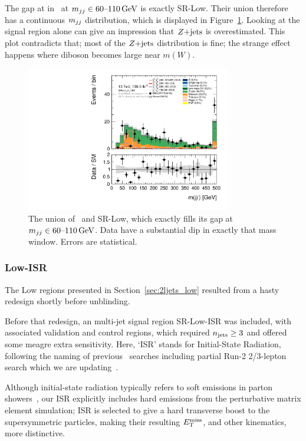 The gap at in \crz\ at $\mjj \in 60\textrm{--}110\,\eV[G]$ is exactly SR-Low.
Their union therefore has a continuous $\mjj$ distribution, which is displayed
in Figure~\ref{fig:2ljets_low_sr_or_cr_region}.
Looking at the signal region alone can give an impression that $\zjets$ is
overestimated.
This plot contradicts that; most of the $\zjets$ distribution is fine;
the strange effect happens where diboson becomes large near $m(W)$.

\begin{figure}[tp]
\centering
\includegraphics[width=0.8\textwidth]{figures/2ljets_low_mjj_SRLow_or_CRZ.pdf}
\caption[
The union of CR-Z and SR-Low
]{%
The union of \crz\ and SR-Low, which exactly fills its gap at
$\mjj \in 60\textrm{--}110\,\eV[G]$.
Data have a substantial dip in exactly that mass window.
Errors are statistical.
}
\label{fig:2ljets_low_sr_or_cr_region}
\end{figure}

\subsubsection{Low-ISR}
\label{sec:2ljets_low_isr}

The Low regions presented in Section~\ref{sec:2ljets_low} resulted from a
hasty redesign shortly before unblinding.

Before that redesign, an multi-jet signal region SR-Low-ISR was included,
with associated validation and control regions,
which required $\njet \geq 3$ and offered some meagre extra sensitivity.
Here, `ISR' stands for Initial-State Radiation, following the naming
of previous \atlas\ searches including partial Run-2 2/3-lepton
search which we are updating~\cite{atlas_23l_SUSY_2016_24}.

Although initial-state radiation typically refers to soft emissions in
parton showers~\cite{corcella2000initial, bewick2022initial},
our ISR explicitly includes hard emissions from the perturbative matrix element
simulation;
ISR is selected to give a hard transverse boost to the supersymmetric
particles, making their resulting $\met$, and other kinematics, more distinctive.

